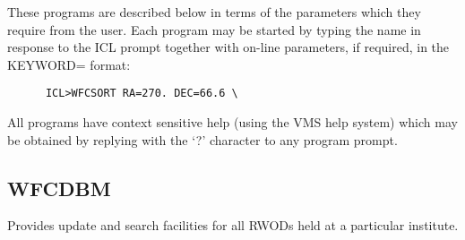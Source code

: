 These programs are described below in terms of the parameters which they require
from the user. 
Each program may be started by typing the name in response to the ICL prompt
together with on-line parameters, if required, in the KEYWORD= format:

\begin{verbatim}
      ICL>WFCSORT RA=270. DEC=66.6 \
\end{verbatim}

All programs have context sensitive help (using the VMS help system) which 
may be obtained by replying with the `?' character to any program prompt.


\subsection{WFCDBM}
Provides update and search facilities for all RWODs held at a particular
institute.

